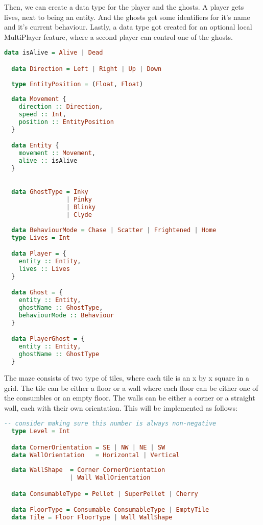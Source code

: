 \documentclass[11pt]{Article}
\begin{document}
Then, we can create a data type for the player and the ghosts. A player gets lives, next to being an entity. And the ghosts get some identifiers for it's name and it's current behaviour. Lastly, a data type got created for an optional local MultiPlayer feature, where a second player can control one of the ghosts.

\begin{lstlisting}[language=Haskell]
  data isAlive = Alive | Dead

  data Direction = Left | Right | Up | Down
  
  type EntityPosition = (Float, Float)
  
  data Movement {
    direction :: Direction,
    speed :: Int,
    position :: EntityPosition
  }

  data Entity {
    movement :: Movement,
    alive :: isAlive
  }

  
  data GhostType = Inky 
                 | Pinky 
                 | Blinky 
                 | Clyde 
  
  data BehaviourMode = Chase | Scatter | Frightened | Home
  type Lives = Int

  data Player = {
    entity :: Entity,
    lives :: Lives
  }

  data Ghost = {
    entity :: Entity,
    ghostName :: GhostType,
    behaviourMode :: Behaviour
  }

  data PlayerGhost = {
    entity :: Entity,
    ghostName :: GhostType
  }
\end{lstlisting}

\noindent The maze consists of two type of tiles, where each tile is an x by x square in a grid. The tile can be either a floor or a wall where each floor can be either one of the consumbles or an empty floor. The walls can be either a corner or a straight wall, each with their own orientation. This will be implemented as follows:
\begin{lstlisting}[language=Haskell]
  -- consider making sure this number is always non-negative
  type Level = Int

  data CornerOrientation = SE | NW | NE | SW
  data WallOrientation   = Horizontal | Vertical
  
  data WallShape  = Corner CornerOrientation
                  | Wall WallOrientation 

  data ConsumableType = Pellet | SuperPellet | Cherry

  data FloorType = Consumable ConsumableType | EmptyTile
  data Tile = Floor FloorType | Wall WallShape
\end{lstlisting}
\end{document}
